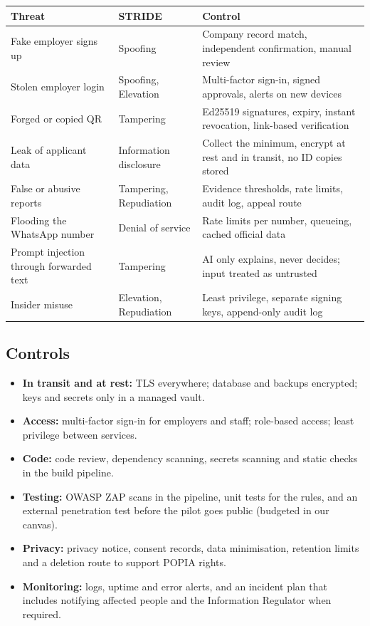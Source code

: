 \documentclass[11pt,a4paper]{article}
\newcommand{\tbl}[1]{\textbf{#1}}
\begin{document}
\begin{center}
\small
\begin{tabularx}{\textwidth}{@{}>{\raggedright\arraybackslash}p{3.0cm}>{\raggedright\arraybackslash}p{2.2cm}>{\raggedright\arraybackslash}X@{}}
\toprule
\tbl{Threat} & \tbl{STRIDE} & \tbl{Control}\\
\midrule
Fake employer signs up & Spoofing & Company record match, independent confirmation, manual review\\
Stolen employer login & Spoofing, Elevation & Multi-factor sign-in, signed approvals, alerts on new devices\\
Forged or copied QR & Tampering & Ed25519 signatures, expiry, instant revocation, link-based verification\\
Leak of applicant data & Information disclosure & Collect the minimum, encrypt at rest and in transit, no ID copies stored\\
False or abusive reports & Tampering, Repudiation & Evidence thresholds, rate limits, audit log, appeal route\\
Flooding the WhatsApp number & Denial of service & Rate limits per number, queueing, cached official data\\
Prompt injection through forwarded text & Tampering & AI only explains, never decides; input treated as untrusted\\
Insider misuse & Elevation, Repudiation & Least privilege, separate signing keys, append-only audit log\\
\bottomrule
\end{tabularx}
\end{center}

\subsection{Controls}
\begin{itemize}
  \item \textbf{In transit and at rest:} TLS everywhere; database and backups encrypted; keys and secrets only in a managed vault.
  \item \textbf{Access:} multi-factor sign-in for employers and staff; role-based access; least privilege between services.
  \item \textbf{Code:} code review, dependency scanning, secrets scanning and static checks in the build pipeline.
  \item \textbf{Testing:} OWASP ZAP scans in the pipeline, unit tests for the rules, and an external penetration test before the pilot goes public (budgeted in our canvas).
  \item \textbf{Privacy:} privacy notice, consent records, data minimisation, retention limits and a deletion route to support POPIA rights.
  \item \textbf{Monitoring:} logs, uptime and error alerts, and an incident plan that includes notifying affected people and the Information Regulator when required.
\end{itemize}
\end{document}
